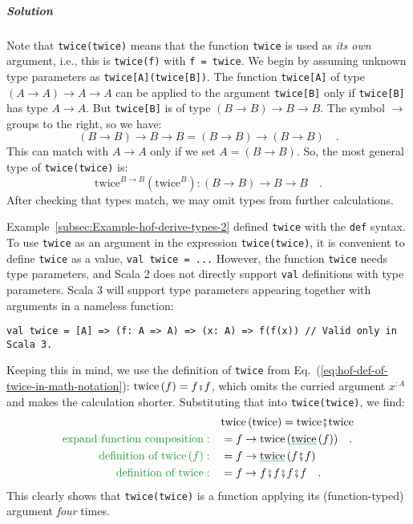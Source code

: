 \subparagraph{Solution}

Note that \lstinline!twice(twice)! means that the function \lstinline!twice!
is used as \emph{its own} argument, i.e., this is \lstinline!twice(f)!
with \lstinline!f = twice!. We begin by assuming unknown type parameters
as \lstinline!twice[A](twice[B])!. The function \lstinline!twice[A]!
of type $\left(A\rightarrow A\right)\rightarrow A\rightarrow A$ can
be applied to the argument \lstinline!twice[B]! only if \lstinline!twice[B]!
has type $A\rightarrow A$. But \lstinline!twice[B]! is of type $\left(B\rightarrow B\right)\rightarrow B\rightarrow B$.
The symbol $\rightarrow$ groups to the right, so we have:
\[
\left(B\rightarrow B\right)\rightarrow B\rightarrow B=\left(B\rightarrow B\right)\rightarrow\left(B\rightarrow B\right)\quad.
\]
This can match with $A\rightarrow A$ only if we set $A=\left(B\rightarrow B\right)$.
So, the most general type of \lstinline!twice(twice)! is:
\begin{equation}
\text{twice}^{B\rightarrow B}(\text{twice}^{B}):\left(B\rightarrow B\right)\rightarrow B\rightarrow B\quad.\label{eq:hof-twice-example-solved3}
\end{equation}
After checking that types match, we may omit types from further calculations.

Example~\ref{subsec:Example-hof-derive-types-2} defined \lstinline!twice!
with the \lstinline!def! syntax. To use \lstinline!twice! as an
argument in the expression \lstinline!twice(twice)!, it is convenient
to define \lstinline!twice! as a value, \lstinline!val twice = ...!
However, the function \lstinline!twice! needs type parameters, and
Scala 2 does not directly support \lstinline!val! definitions with
type parameters. Scala 3 will support type parameters appearing together
with arguments in a nameless function:
\begin{lstlisting}
val twice = [A] => (f: A => A) => (x: A) => f(f(x)) // Valid only in Scala 3.
\end{lstlisting}
Keeping this in mind, we use the definition of \lstinline!twice!
from Eq.~(\ref{eq:hof-def-of-twice-in-math-notation}): $\text{twice}\,(f)=f\bef f$,
which omits the curried argument $x^{:A}$ and makes the calculation
shorter. Substituting that into \lstinline!twice(twice)!, we find:
\begin{align*}
 & \text{twice}\,(\text{twice})=\text{twice}\bef\text{twice}\\
{\color{greenunder}\text{expand function composition}:}\quad & =f\rightarrow\text{twice}\,(\gunderline{\text{twice}}\,(f))\quad.\\
{\color{greenunder}\text{definition of }\text{twice}\,(f):}\quad & =f\rightarrow\gunderline{\text{twice}}\,(f\bef f)\\
{\color{greenunder}\text{definition of twice}:}\quad & =f\rightarrow f\bef f\bef f\bef f\quad.
\end{align*}
This clearly shows that \lstinline!twice(twice)! is a function applying
its (function-typed) argument \emph{four} times.

